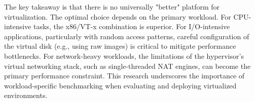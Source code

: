 \documentclass[conference]{IEEEtran}
\begin{document}
The key takeaway is that there is no universally "better" platform for virtualization. The optimal choice depends on the primary workload. For CPU-intensive tasks, the x86/VT-x combination is superior. For I/O-intensive applications, particularly with random access patterns, careful configuration of the virtual disk (e.g., using raw images) is critical to mitigate performance bottlenecks. For network-heavy workloads, the limitations of the hypervisor's virtual networking stack, such as single-threaded NAT engines, can become the primary performance constraint. This research underscores the importance of workload-specific benchmarking when evaluating and deploying virtualized environments.




\end{document}
